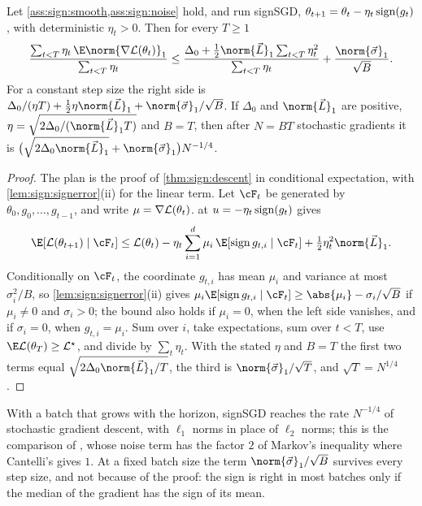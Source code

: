 \begin{refsection}
\begin{theorem}[signSGD]\label{thm:sign:signsgd}
Let \cref{ass:sign:smooth,ass:sign:noise} hold, and run signSGD, $\theta_{t+1}=\theta_t-\eta_t\operatorname{sign}(g_t)$, with deterministic $\eta_t>0$. Then for every $T\ge1$
\[
  \frac{\sum_{t<T}\eta_t\,\E\norm{\nabla\Loss(\theta_t)}_1}{\sum_{t<T}\eta_t}\le\frac{\Delta_0+\frac12\norm{\vec L}_1\sum_{t<T}\eta_t^2}{\sum_{t<T}\eta_t}+\frac{\norm{\vec\sigma}_1}{\sqrt B}.
\]
For a constant step size the right side is $\Delta_0/(\eta T)+\frac12\eta\norm{\vec L}_1+\norm{\vec\sigma}_1/\sqrt B$. If $\Delta_0$ and $\norm{\vec L}_1$ are positive, $\eta=\sqrt{2\Delta_0/(\norm{\vec L}_1T)}$ and $B=T$, then after $N=BT$ stochastic gradients it is $\bigl(\sqrt{2\Delta_0\norm{\vec L}_1}+\norm{\vec\sigma}_1\bigr)N^{-1/4}$.
\end{theorem}

\begin{proof}
The plan is the proof of \cref{thm:sign:descent} in conditional expectation, with \cref{lem:sign:signerror}(ii) for the linear term. Let $\cF_t$ be generated by $\theta_0,g_0,\dots,g_{t-1}$, and write $\mu=\nabla\mathcal{L}(\theta_t)$.  at $u=-\eta_t\operatorname{sign}(g_t)$ gives
\[
  \E[\Loss(\theta_{t+1})\mid\cF_t]\le\Loss(\theta_t)-\eta_t\sum_{i=1}^d\mu_i\,\E[\sign g_{t,i}\mid\cF_t]+\tfrac12\eta_t^2\norm{\vec L}_1 .
\]
Conditionally on $\cF_t$, the coordinate $g_{t,i}$ has mean $\mu_i$ and variance at most $\sigma_i^2/B$, so \cref{lem:sign:signerror}(ii) gives $\mu_i\E[\sign g_{t,i}\mid\cF_t]\ge\abs{\mu_i}-\sigma_i/\sqrt B$ if $\mu_i\ne0$ and $\sigma_i>0$; the bound also holds if $\mu_i=0$, when the left side vanishes, and if $\sigma_i=0$, when $g_{t,i}=\mu_i$. Sum over $i$, take expectations, sum over $t<T$, use $\E\Loss(\theta_T)\ge\Loss^\star$, and divide by $\sum_t\eta_t$. With the stated $\eta$ and $B=T$ the first two terms equal $\sqrt{2\Delta_0\norm{\vec L}_1/T}$, the third is $\norm{\vec\sigma}_1/\sqrt T$, and $\sqrt T=N^{1/4}$.
\end{proof}

With a batch that grows with the horizon, signSGD reaches the rate $N^{-1/4}$ of stochastic gradient descent, with $\ell_1$ norms in place of $\ell_2$ norms; this is the comparison of \textcite{BernsteinEtAl2018}, whose noise term has the factor $2$ of Markov's inequality where Cantelli's gives $1$. At a fixed batch size the term $\norm{\vec\sigma}_1/\sqrt B$ survives every step size, and not because of the proof: the sign is right in most batches only if the median of the gradient has the sign of its mean.


\end{refsection}
